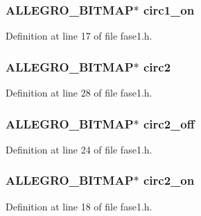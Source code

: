 \hypertarget{struct_level_one_a15699608afb18fad793848cd8fd32fe0}{
\subsubsection[{circ1\-\_\-on}]{\setlength{\rightskip}{0pt plus 5cm}A\-L\-L\-E\-G\-R\-O\-\_\-\-B\-I\-T\-M\-A\-P$\ast$ circ1\-\_\-on}}\label{struct_level_one_a15699608afb18fad793848cd8fd32fe0}


Definition at line 17 of file fase1.\-h.

\hypertarget{struct_level_one_a1b8836cb8a00a286c87bfbafdacbd03d}{
\subsubsection[{circ2}]{\setlength{\rightskip}{0pt plus 5cm}A\-L\-L\-E\-G\-R\-O\-\_\-\-B\-I\-T\-M\-A\-P$\ast$ circ2}}\label{struct_level_one_a1b8836cb8a00a286c87bfbafdacbd03d}


Definition at line 28 of file fase1.\-h.

\hypertarget{struct_level_one_a384448f3d672f70b70b1bf454cb46e50}{
\subsubsection[{circ2\-\_\-off}]{\setlength{\rightskip}{0pt plus 5cm}A\-L\-L\-E\-G\-R\-O\-\_\-\-B\-I\-T\-M\-A\-P$\ast$ circ2\-\_\-off}}\label{struct_level_one_a384448f3d672f70b70b1bf454cb46e50}


Definition at line 24 of file fase1.\-h.

\hypertarget{struct_level_one_aa582b8f9acdbb85a2d1d54705e26fa15}{
\subsubsection[{circ2\-\_\-on}]{\setlength{\rightskip}{0pt plus 5cm}A\-L\-L\-E\-G\-R\-O\-\_\-\-B\-I\-T\-M\-A\-P$\ast$ circ2\-\_\-on}}\label{struct_level_one_aa582b8f9acdbb85a2d1d54705e26fa15}


Definition at line 18 of file fase1.\-h.

